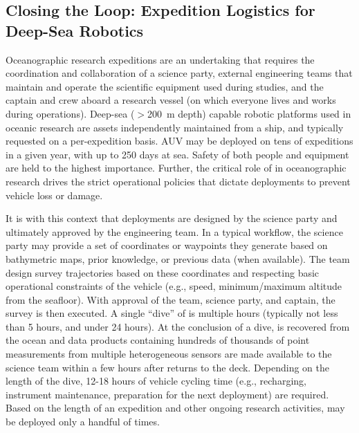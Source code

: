 \subsection{Closing the Loop: Expedition Logistics for Deep-Sea Robotics}
Oceanographic research expeditions are an undertaking that requires the coordination and collaboration of a science party, external engineering teams that maintain and operate the scientific equipment used during studies, and the captain and crew aboard a research vessel (on which everyone lives and works during operations). Deep-sea ($>$\SI{200}{\meter} depth) capable robotic platforms used in oceanic research are assets independently maintained from a ship, and typically requested on a per-expedition basis. AUV \Sentry may be deployed on tens of expeditions in a given year, with up to 250 days at sea\autocite{kaiser2016design}. Safety of both people and equipment are held to the highest importance. Further, the critical role of \Sentry in oceanographic research drives the strict operational policies that dictate \Sentry deployments to prevent vehicle loss or damage.

It is with this context that \Sentry deployments are designed by the science party and ultimately approved by the \Sentry engineering team. In a typical workflow, the science party may provide a set of coordinates or waypoints they generate based on bathymetric maps, prior knowledge, or previous data (when available). The \Sentry team design survey trajectories based on these coordinates and respecting basic operational constraints of the vehicle (e.g., speed, minimum/maximum altitude from the seafloor). With approval of the \Sentry team, science party, and captain, the survey is then executed. A single ``dive'' of \Sentry is multiple hours (typically not less than 5 hours, and under 24 hours). At the conclusion of a dive, \Sentry is recovered from the ocean and data products containing hundreds of thousands of point measurements from multiple heterogeneous sensors are made available to the science team within a few hours after \Sentry returns to the deck. Depending on the length of the dive, 12-18 hours of vehicle cycling time (e.g., recharging, instrument maintenance, preparation for the next deployment) are required. Based on the length of an expedition and other ongoing research activities, \Sentry may be deployed only a handful of times.

